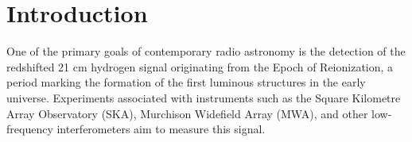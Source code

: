 \documentclass[linenumbers,trackchanges]{aastex701}
\begin{document}



\section{Introduction} \label{sec:Intro}
One of the primary goals of contemporary radio astronomy is the detection of the redshifted 21 cm hydrogen signal originating from the Epoch of Reionization, a period marking the formation of the first luminous structures in the early universe. Experiments associated with instruments such as the Square Kilometre Array Observatory (SKA), Murchison Widefield Array (MWA), and other low-frequency interferometers aim to measure this signal.
\end{document}
